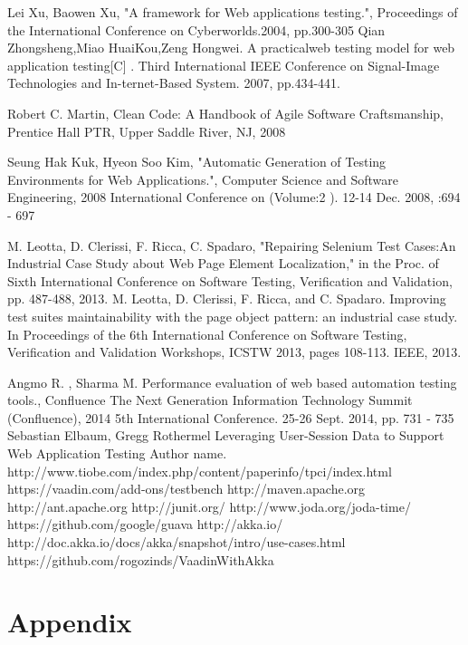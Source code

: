 \documentclass[12pt,a4paper,english%
]{tutthesis}
\begin{document}
 	
	\begin{thebibliography}{7}
	
			Lei Xu, Baowen Xu,
			"A framework for Web applications testing.",
			Proceedings of the International Conference on Cyberworlds.2004, pp.300-305
		Qian Zhongsheng,Miao HuaiKou,Zeng Hongwei.
		 A practicalweb testing model for web application testing[C] .
		 Third International IEEE Conference on Signal-Image Technologies and
		 In-ternet-Based System. 2007, pp.434-441.
		 
		Robert C. Martin,
		Clean Code: A Handbook of Agile Software Craftsmanship,
		Prentice Hall PTR, Upper Saddle River, NJ, 2008
		
		Seung Hak Kuk, Hyeon Soo Kim,			
		"Automatic Generation of Testing Environments for Web Applications.",
		Computer Science and Software Engineering, 2008 International Conference on
		(Volume:2 ). 12-14 Dec. 2008, :694 - 697
		
		M. Leotta, D. Clerissi, F. Ricca, C. Spadaro,
		"Repairing Selenium Test Cases:An Industrial Case Study about Web Page
		 Element Localization," in the Proc. of Sixth International Conference on Software Testing, Verification and Validation, pp. 487-488, 2013. 
		M. Leotta, D. Clerissi, F. Ricca, and C. Spadaro. Improving test suites
		maintainability with the page object pattern: an industrial case study.
		In Proceedings of the 6th International Conference on Software Testing, Verification and Validation Workshops,
		ICSTW 2013, pages 108-113. IEEE, 2013. 
		
		
		Angmo R. , Sharma M.	
		Performance evaluation of web based automation testing tools.,
		Confluence The Next Generation Information Technology Summit (Confluence),
		2014 5th International Conference. 25-26 Sept. 2014, pp. 731 - 735
		Sebastian Elbaum, Gregg Rothermel
		Leveraging User-Session Data to Support Web Application Testing
		 Author name.
		http://www.tiobe.com/index.php/content/paperinfo/tpci/index.html
		https://vaadin.com/add-ons/testbench
		http://maven.apache.org
		http://ant.apache.org
		http://junit.org/
		http://www.joda.org/joda-time/
		https://github.com/google/guava
		http://akka.io/
		http://doc.akka.io/docs/akka/snapshot/intro/use-cases.html
		https://github.com/rogozinds/VaadinWithAkka
	\end{thebibliography}
  \section {Appendix}
\end{document}
